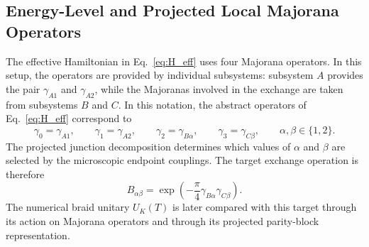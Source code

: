 \subsection{Energy-Level and Projected Local Majorana Operators\newline}
The effective Hamiltonian in Eq.~\ref{eq:H_eff} uses four Majorana operators. In this setup, the operators are provided by individual subsystems: subsystem $A$ provides the pair $\gamma_{A1}$ and $\gamma_{A2}$, while the Majoranas involved in the exchange are taken from subsystems $B$ and $C$. In this notation, the abstract operators of Eq.~\ref{eq:H_eff} correspond to
\begin{equation}
  \gamma_0=\gamma_{A1},
  \qquad
  \gamma_1=\gamma_{A2},
  \qquad
  \gamma_2=\gamma_{B\alpha},
  \qquad
  \gamma_3=\gamma_{C\beta},
  \qquad
  \alpha,\beta\in\{1,2\}.
\end{equation}
The projected junction decomposition determines which values of $\alpha$ and $\beta$ are selected by the microscopic endpoint couplings.
The target exchange operation is therefore
\begin{equation}
  B_{\alpha\beta} = \exp\left(-\frac{\pi}{4}\gamma_{B\alpha}\gamma_{C\beta}\right).
\end{equation}
The numerical braid unitary $U_K(T)$ is later compared with this target through its action on Majorana operators and through its projected parity-block representation.\\

